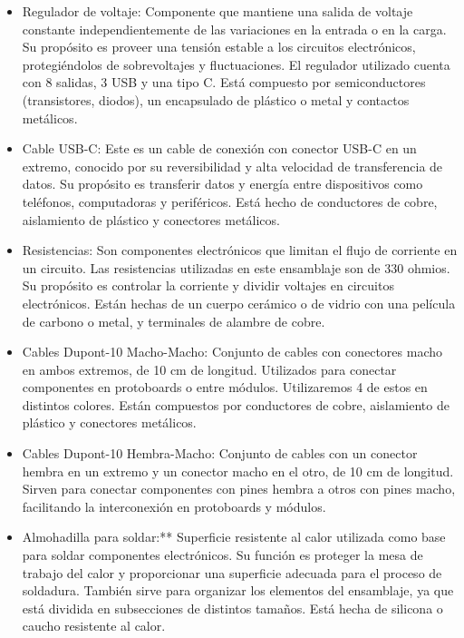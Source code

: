 \begin{itemize}
    \item Regulador de voltaje: Componente que mantiene una salida de voltaje constante independientemente de las variaciones en la entrada o en la carga. Su propósito es proveer una tensión estable a los circuitos electrónicos, protegiéndolos de sobrevoltajes y fluctuaciones. El regulador utilizado cuenta con 8 salidas, 3 USB y una tipo C. Está compuesto por semiconductores (transistores, diodos), un encapsulado de plástico o metal y contactos metálicos.
    
    \item Cable USB-C: Este es un cable de conexión con conector USB-C en un extremo, conocido por su reversibilidad y alta velocidad de transferencia de datos. Su propósito es transferir datos y energía entre dispositivos como teléfonos, computadoras y periféricos. Está hecho de conductores de cobre, aislamiento de plástico y conectores metálicos.
    
    \item Resistencias: Son componentes electrónicos que limitan el flujo de corriente en un circuito. Las resistencias utilizadas en este ensamblaje son de 330 ohmios. Su propósito es controlar la corriente y dividir voltajes en circuitos electrónicos. Están hechas de un cuerpo cerámico o de vidrio con una película de carbono o metal, y terminales de alambre de cobre.
    
    \item Cables Dupont-10 Macho-Macho: Conjunto de cables con conectores macho en ambos extremos, de 10 cm de longitud. Utilizados para conectar componentes en protoboards o entre módulos. Utilizaremos 4 de estos en distintos colores. Están compuestos por conductores de cobre, aislamiento de plástico y conectores metálicos.
    
    \item Cables Dupont-10 Hembra-Macho: Conjunto de cables con un conector hembra en un extremo y un conector macho en el otro, de 10 cm de longitud. Sirven para conectar componentes con pines hembra a otros con pines macho, facilitando la interconexión en protoboards y módulos.
    
    \item Almohadilla para soldar:** Superficie resistente al calor utilizada como base para soldar componentes electrónicos. Su función es proteger la mesa de trabajo del calor y proporcionar una superficie adecuada para el proceso de soldadura. También sirve para organizar los elementos del ensamblaje, ya que está dividida en subsecciones de distintos tamaños. Está hecha de silicona o caucho resistente al calor.
    \end{itemize}
